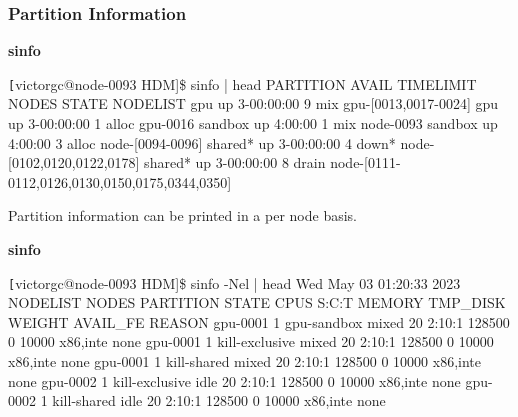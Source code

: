 \begin{frame}[fragile]
\frametitle{Partition Information}
\begin{block}{\textbf{sinfo}}
\begin{semiverbatim}\tiny \texttt
[victorgc@node-0093 HDM]\$ sinfo | head
PARTITION       AVAIL  TIMELIMIT  NODES  STATE NODELIST
gpu                up 3-00:00:00      9    mix gpu-[0013,0017-0024]
gpu                up 3-00:00:00      1  alloc gpu-0016
sandbox            up    4:00:00      1    mix node-0093
sandbox            up    4:00:00      3  alloc node-[0094-0096]
shared*            up 3-00:00:00      4  down* node-[0102,0120,0122,0178]
shared*            up 3-00:00:00      8  drain node-[0111-0112,0126,0130,0150,0175,0344,0350]
\end{semiverbatim}
\end{block}
Partition information can be printed in a per node basis.
\begin{block}{\textbf{sinfo}}
\begin{semiverbatim}\tiny \texttt
[victorgc@node-0093 HDM]\$ sinfo -Nel | head
Wed May 03 01:20:33 2023
NODELIST   NODES       PARTITION       STATE CPUS    S:C:T MEMORY TMP_DISK WEIGHT AVAIL_FE REASON
gpu-0001       1     gpu-sandbox       mixed 20     2:10:1 128500        0  10000 x86,inte none
gpu-0001       1  kill-exclusive       mixed 20     2:10:1 128500        0  10000 x86,inte none
gpu-0001       1     kill-shared       mixed 20     2:10:1 128500        0  10000 x86,inte none
gpu-0002       1  kill-exclusive        idle 20     2:10:1 128500        0  10000 x86,inte none
gpu-0002       1     kill-shared        idle 20     2:10:1 128500        0  10000 x86,inte none
\end{semiverbatim}
\end{block}
\end{frame}
